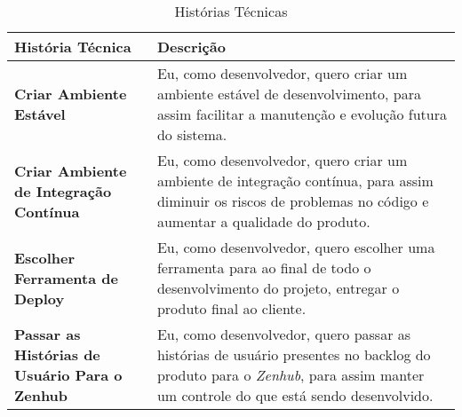\begin{table}[H]
	\begin{tabular}{|p{5.0cm}|p{10.0cm}|} 
	\hline
	\textbf{História Técnica} & \textbf{Descrição} \\ \hline
	\textbf{Criar Ambiente Estável} & Eu, como desenvolvedor, quero criar um ambiente estável de desenvolvimento, para assim facilitar a manutenção e evolução futura do sistema. \\ \hline
	\textbf{Criar Ambiente de Integração Contínua} & Eu, como desenvolvedor, quero criar um ambiente de integração contínua, para assim diminuir os riscos de problemas no código e aumentar a qualidade do produto. \\ \hline
	\textbf{Escolher Ferramenta de Deploy} & Eu, como desenvolvedor, quero escolher uma ferramenta para ao final de todo o desenvolvimento do projeto, entregar o produto final ao cliente. \\ \hline
	\textbf{Passar as Histórias de Usuário Para o Zenhub} & Eu, como desenvolvedor, quero passar as histórias de usuário presentes no backlog do produto para o \textit{Zenhub}, para assim manter um controle do que está sendo desenvolvido. \\ \hline
	\end{tabular}
	 \caption{Histórias Técnicas}
	 \label{tab:historias_tecnicas}
\end{table}